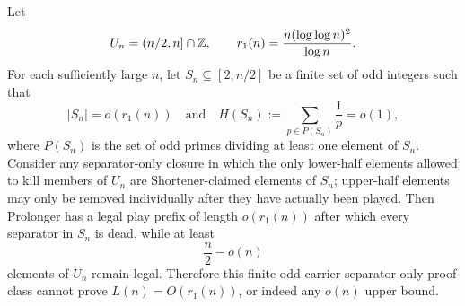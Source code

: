 \begin{proposition}\label{prop:separator-only}
Let
\[
  U_n=(n/2,n]\cap\mathbb{Z},\qquad
  r_1(n)=\frac{n(\log\log n)^2}{\log n}.
\]
For each sufficiently large $n$, let $S_n\subseteq[2,n/2]$ be a finite set of
odd integers such that
\[
  |S_n|=o(r_1(n))
  \quad\text{and}\quad
  H(S_n):=\sum_{p\in P(S_n)}\frac1p=o(1),
\]
where $P(S_n)$ is the set of odd primes dividing at least one element of
$S_n$.  Consider any separator-only closure in which the only lower-half
elements allowed to kill members of $U_n$ are Shortener-claimed elements of
$S_n$; upper-half elements may only be removed individually after they have
actually been played.  Then Prolonger has a legal play prefix of length
$o(r_1(n))$ after which every separator in $S_n$ is dead, while at least
\[
  \frac n2-o(n)
\]
elements of $U_n$ remain legal.  Therefore this finite odd-carrier
separator-only proof class cannot prove $L(n)=O(r_1(n))$, or indeed any
$o(n)$ upper bound.
\end{proposition}


